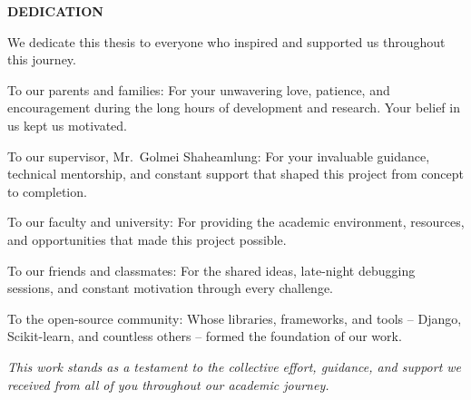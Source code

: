 \vspace*{0.6cm}
\begin{center}
    \fontsize{16}{19}\selectfont
    \textbf{DEDICATION}\\[0.5cm]
\end{center}

\vspace{1cm}

{
\fontsize{12}{14}\selectfont
We dedicate this thesis to everyone who inspired and supported us throughout this journey.

\noindent
To our parents and families: For your unwavering love, patience, and encouragement during the long hours of development and research. Your belief in us kept us motivated.

\noindent
To our supervisor, Mr.\ Golmei Shaheamlung: For your invaluable guidance, technical mentorship, and constant support that shaped this project from concept to completion.

\noindent
To our faculty and university: For providing the academic environment, resources, and opportunities that made this project possible.

\noindent
To our friends and classmates: For the shared ideas, late-night debugging sessions, and constant motivation through every challenge.

\noindent
To the open-source community: Whose libraries, frameworks, and tools -- Django, Scikit-learn, and countless others -- formed the foundation of our work.

\noindent
\textit{This work stands as a testament to the collective effort, guidance, and support we received from all of you throughout our academic journey.}
}

